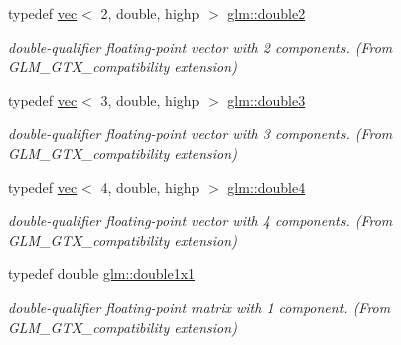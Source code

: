 \begin{DoxyCompactItemize}
\mbox{\label{group__gtx__compatibility_gaadf812a4d848bf77684844269e1d44eb}} 
typedef \hyperlink{structglm_1_1vec}{vec}$<$ 2, double, highp $>$ \hyperlink{group__gtx__compatibility_gaadf812a4d848bf77684844269e1d44eb}{glm\+::double2}
\begin{DoxyCompactList}\small\item\em double-\/qualifier floating-\/point vector with 2 components. (From G\+L\+M\+\_\+\+G\+T\+X\+\_\+compatibility extension) \end{DoxyCompactList}\item 
\mbox{\label{group__gtx__compatibility_ga59c2d0879cea219643aec2f75b8beee9}} 
typedef \hyperlink{structglm_1_1vec}{vec}$<$ 3, double, highp $>$ \hyperlink{group__gtx__compatibility_ga59c2d0879cea219643aec2f75b8beee9}{glm\+::double3}
\begin{DoxyCompactList}\small\item\em double-\/qualifier floating-\/point vector with 3 components. (From G\+L\+M\+\_\+\+G\+T\+X\+\_\+compatibility extension) \end{DoxyCompactList}\item 
\mbox{\label{group__gtx__compatibility_gadfb754a50db97dcefbd7a3435ad6eda4}} 
typedef \hyperlink{structglm_1_1vec}{vec}$<$ 4, double, highp $>$ \hyperlink{group__gtx__compatibility_gadfb754a50db97dcefbd7a3435ad6eda4}{glm\+::double4}
\begin{DoxyCompactList}\small\item\em double-\/qualifier floating-\/point vector with 4 components. (From G\+L\+M\+\_\+\+G\+T\+X\+\_\+compatibility extension) \end{DoxyCompactList}\item 
\mbox{\label{group__gtx__compatibility_ga1c87d3042377335eb050a20ab0ec148a}} 
typedef double \hyperlink{group__gtx__compatibility_ga1c87d3042377335eb050a20ab0ec148a}{glm\+::double1x1}
\begin{DoxyCompactList}\small\item\em double-\/qualifier floating-\/point matrix with 1 component. (From G\+L\+M\+\_\+\+G\+T\+X\+\_\+compatibility extension) \end{DoxyCompactList}\item 
\mbox{\label{group__gtx__compatibility_ga38235425d2401904456ecbc342d87453}} 

\end{DoxyCompactItemize}
